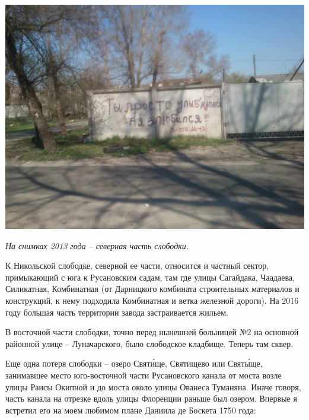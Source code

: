 \begin{center}
\includegraphics[width=\linewidth]{chast-gorodki/cherto/s_niksl_DSC_0048.JPG}
\end{center}

\textit{На снимках 2013 года – северная часть слободки.}
\vspace*{\fill}
\newpage

К Никольской слободке, северной ее части, относится и частный сектор, примыкающий с юга к Русановским садам, там где улицы Сагайдака, Чаадаева, Силикатная, Комбинатная (от Дарницкого комбината строительных материалов и конструкций, к нему подходила Комбинатная и ветка железной дороги). На 2016 году большая часть территории завода застраивается жильем.

В восточной части слободки, точно перед нынешней больницей №2 на основной районной улице – Луначарского, было слободское кладбище. Теперь там сквер.

Еще одна потеря слободки – озеро Свят\'ище, Святищево или Свят\'ыще, занимавшее место юго-восточной части Русановского канала от моста возле улицы Раисы Окипной и до моста около улицы Ованеса Туманяна. Иначе говоря, часть канала на отрезке вдоль улицы Флоренции раньше был озером. Впервые я встретил его на моем любимом плане Даниила де Боскета 1750 года:

